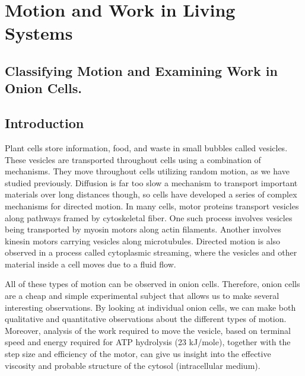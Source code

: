\chapter{Motion and Work in Living Systems}
\thispagestyle{fancy}
%
\section{Classifying Motion and Examining Work in Onion Cells.}
\section*{Introduction}
Plant cells store information, food, and waste in small bubbles called vesicles.
These vesicles are transported throughout cells using a combination of mechanisms.
They move throughout cells utilizing random motion, as we have studied previously.
Diffusion is far too slow a mechanism to transport important materials over long distances though, so cells have developed a series of complex mechanisms for directed motion.
In many cells, motor proteins transport vesicles along pathways framed by cytoskeletal fiber.
One such process involves vesicles being transported by myosin motors along actin filaments.
Another involves kinesin motors carrying vesicles along microtubules.
Directed motion is also observed in a process called cytoplasmic streaming, where the vesicles and other material inside a cell moves due to a fluid flow.
\par
All of these types of motion can be observed in onion cells.
Therefore, onion cells are a cheap and simple experimental subject that allows us to make several interesting observations.
By looking at individual onion cells, we can make both qualitative and quantitative observations about the different types of motion.
Moreover, analysis of the work required to move the vesicle, based on terminal speed and energy required for ATP hydrolysis (23 kJ/mole), together with the step size and efficiency of the motor, can give us insight into the effective viscosity and probable structure of the cytosol (intracellular medium).
